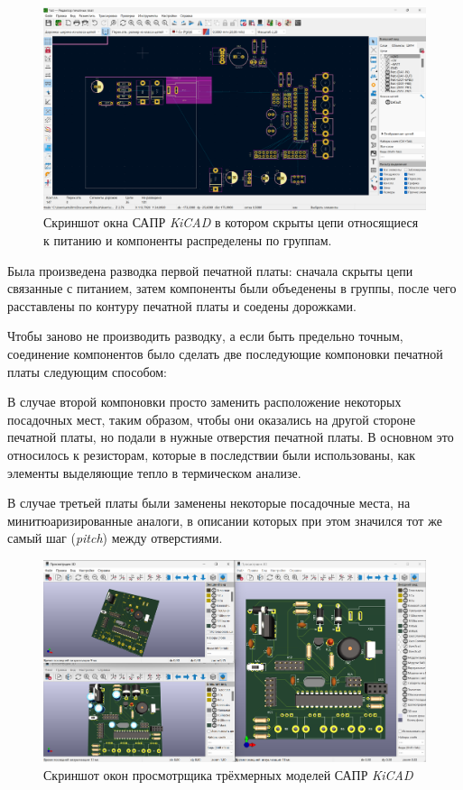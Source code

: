 \begin{figure}[h]
  \centering
  \includegraphics[scale = 0.20]{../img/scrot/Screenshot-2024-05-02-173914.png}
 \caption{Скриншот окна САПР \textit{KiCAD} в котором скрыты цепи относящиеся к питанию и компоненты распределены по группам.}
\end{figure}

Была произведена разводка первой печатной платы:
сначала скрыты цепи связанные с питанием, затем компоненты были объеденены в группы, после чего расставлены по контуру печатной платы и соедены дорожками.

Чтобы заново не производить разводку, а если быть предельно точным,
соединение компонентов было сделать две последующие компоновки печатной платы следующим способом:


В случае второй компоновки просто заменить расположение некоторых посадочных мест, таким образом, чтобы они оказались на другой стороне печатной платы, но подали в нужные отверстия печатной платы. В основном это относилось к резисторам, которые в последствии были использованы, как элементы выделяющие тепло в термическом анализе.


В случае третьей платы были заменены некоторые посадочные места, на минитюаризированные аналоги, в описании которых при этом значился тот же самый шаг (\textit{pitch}) между отверстиями.

\begin{figure}[h]
  \centering
  \includegraphics[scale = 0.20]{../img/scrot/Screenshot-2024-05-07-112847.png}
 \caption{Скриншот окон просмотрщика трёхмерных моделей САПР \textit{KiCAD}}
\end{figure}


